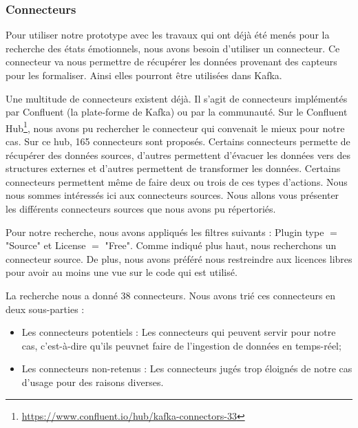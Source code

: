 \documentclass{article}
\begin{document}
		\subsubsection{Connecteurs}
			Pour utiliser notre prototype avec les travaux qui ont déjà été menés pour la recherche des états émotionnels, nous avons besoin d'utiliser un connecteur.
			Ce connecteur va nous permettre de récupérer les données provenant des capteurs pour les formaliser.
			Ainsi elles pourront être utilisées dans Kafka.\par
			Une multitude de connecteurs existent déjà.
			Il s'agit de connecteurs implémentés par Confluent (la plate-forme de Kafka) ou par la communauté.
			Sur le Confluent Hub\footnote{\href{https://www.confluent.io/hub/kafka-connectors-33}{https://www.confluent.io/hub/kafka-connectors-33}}, nous avons pu rechercher le connecteur qui convenait le mieux pour notre cas.
			Sur ce hub, 165 connecteurs sont proposés.
			Certains connecteurs permette de récupérer des données sources, d'autres permettent d'évacuer les données vers des structures externes et d'autres permettent de transformer les données.
			Certains connecteurs permettent même de faire deux ou trois de ces types d'actions.
			Nous nous sommes intéressés ici aux connecteurs sources.
			Nous allons vous présenter les différents connecteurs sources que nous avons pu répertoriés.\par
			Pour notre recherche, nous avons appliqués les filtres suivants : \newline
			Plugin type $=$ "Source" et License $=$ "Free".\newline
			Comme indiqué plus haut, nous recherchons un connecteur source.
			De plus, nous avons préféré nous restreindre aux licences libres pour avoir au moins une vue sur le code qui est utilisé.\par
			La recherche nous a donné 38 connecteurs.
			Nous avons trié ces connecteurs en deux sous-parties :
			\begin{itemize}
				\item Les connecteurs potentiels : Les connecteurs qui peuvent servir pour notre cas, c'est-à-dire qu'ils peuvnet faire de l’ingestion de données en temps-réel;
				\item Les connecteurs non-retenus : Les connecteurs jugés trop éloignés de notre cas d’usage pour des raisons diverses.
			\end{itemize}
\end{document}
